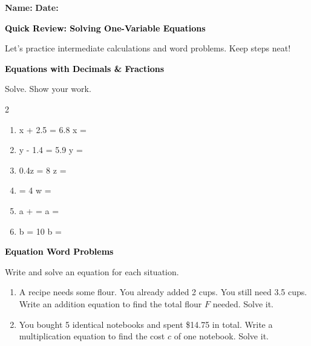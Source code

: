 \documentclass[12pt, letterpaper, fleqn]{article}
\newcommand{\blank}{\underline{\hspace{2.2cm}}}
\begin{document}
\textbf{Name:} \underline{\hspace{5cm}}
\hfill
\textbf{Date:} \underline{\hspace{3cm}}\\

\begin{tcolorbox}[colback=customteal!20]
    \large\textcolor{black}{\textbf{Quick Review: Solving One-Variable Equations}}
\end{tcolorbox}

\vspace{3mm}
\noindent
Let's practice intermediate calculations and word problems. Keep steps neat!

\vspace{4mm}

\begin{tcolorbox}[colback=customteal!20]
\large\textcolor{black}{\textbf{Equations with Decimals \& Fractions}}
\end{tcolorbox}

\noindent
Solve. Show your work.

\vspace{3mm}
\begin{multicols}{2}
\begin{enumerate}[itemsep=1cm, leftmargin=0.6cm]
\item x + 2.5 = 6.8 \quad \rightarrow \quad x = \blank
\item y - 1.4 = 5.9 \quad \rightarrow \quad y = \blank
\item 0.4z = 8 \quad \rightarrow \quad z = \blank
\item {} = 4 \quad \rightarrow \quad w = \blank
\item a +  =  \quad \rightarrow \quad a = \blank
\item {}b = 10 \quad \rightarrow \quad b = \blank
\end{enumerate}
\end{multicols}
\newpage

\begin{tcolorbox}[colback=customteal!20]
\large\textcolor{black}{\textbf{Equation Word Problems}}
\end{tcolorbox}

\noindent
Write and solve an equation for each situation.

\vspace{3mm}
\begin{enumerate}[itemsep=1.2cm, leftmargin=0.6cm]
\item A recipe needs some flour. You already added 2 cups. You still need 3.5 cups. Write an addition equation to find the total flour $F$ needed. Solve it.
\vspace{1cm}
\item You bought 5 identical notebooks and spent \$14.75 in total. Write a multiplication equation to find the cost $c$ of one notebook. Solve it.
\vspace{1cm}
\end{enumerate}
\newpage
\end{document}
